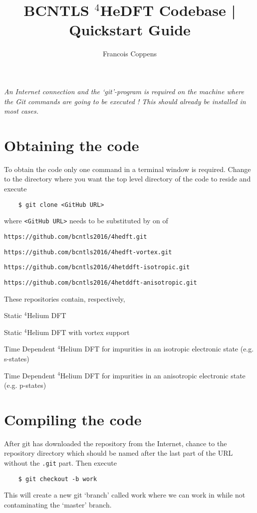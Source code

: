 \documentclass[10pt,a4paper]{article}
\author{Francois Coppens}
\title{BCNTLS $^4$HeDFT Codebase | Quickstart Guide }
\begin{document}
	\maketitle
	\emph{An Internet connection and the `git'-program is required on the machine where the Git commands are going to be executed ! This should already be installed in most cases.}
	\section{Obtaining the code}
	To obtain the code only one command in a terminal window is required. Change to the directory where you want the top level directory of the code to reside and execute
	\begin{verbatim}
	$ git clone <GitHub URL>
	\end{verbatim}
	where \verb|<GitHub URL>| needs to be substituted by on of
	\begin{description}[align=right,labelwidth=0.35cm]
		\item[1.] \verb|https://github.com/bcntls2016/4hedft.git|
		\item[2.] \verb|https://github.com/bcntls2016/4hedft-vortex.git|
		\item[3.] \verb|https://github.com/bcntls2016/4hetddft-isotropic.git|
		\item[4.] \verb|https://github.com/bcntls2016/4hetddft-anisotropic.git|
	\end{description}

	\noindent These repositories contain, respectively,

	\begin{description}[align=right,labelwidth=0.35cm]
	\item [1.] Static $^4$Helium DFT
	\item[2.] Static $^4$Helium DFT with vortex support
	\item[3.] Time Dependent $^4$Helium DFT for impurities in an isotropic electronic state (e.g. s-states)
	\item[4.] Time Dependent $^4$Helium DFT for impurities in an anisotropic electronic state (e.g. p-states)
	\end{description}

	\section{Compiling the code}
	After git has downloaded the repository from the Internet, chance to the repository directory which should be named after the last part of the URL without the \verb|.git| part. Then execute
	\begin{verbatim}
	$ git checkout -b work
	\end{verbatim}
	This will create a new git `branch' called work where we can work in while not contaminating the `master' branch.
\end{document}
